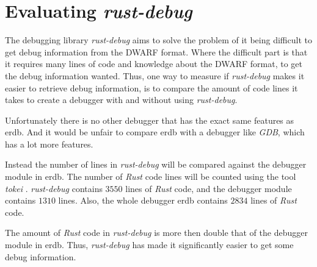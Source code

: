 
\section{Evaluating \emph{rust-debug}}
The debugging library \emph{rust-debug} aims to solve the problem of it being difficult to get debug information from the \gls{DWARF} format.
Where the difficult part is that it requires many lines of code and knowledge about the \gls{DWARF} format, to get the debug information wanted.
Thus, one way to measure if \emph{rust-debug} makes it easier to retrieve debug information, is to compare the amount of code lines it takes to create a debugger with and without using \emph{rust-debug}.


Unfortunately there is no other debugger that has the exact same features as \gls{erdb}.
And it would be unfair to compare \gls{erdb} with a debugger like \emph{GDB}, which has a lot more features.


Instead the number of lines in \emph{rust-debug} will be compared against the debugger module in \gls{erdb}.
The number of \emph{Rust} code lines will be counted using the tool \emph{tokei} \cite{tokei}.
\emph{rust-debug} contains $3550$ lines of \emph{Rust} code, and the debugger module contains $1310$ lines.
Also, the whole debugger \gls{erdb} contains $2834$ lines of \emph{Rust} code.


The amount of \emph{Rust} code in \emph{rust-debug} is more then double that of the debugger module in \gls{erdb}.
Thus, \emph{rust-debug} has made it significantly easier to get some debug information.




